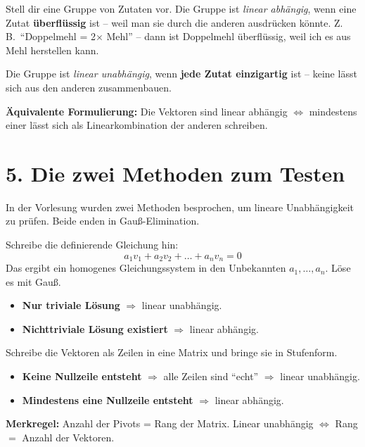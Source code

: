\documentclass[a4paper,12pt]{article}
\begin{document}
\begin{analogie}
Stell dir eine Gruppe von Zutaten vor. Die Gruppe ist \emph{linear abh\"angig}, wenn eine Zutat \textbf{\"uberfl\"ussig} ist -- weil man sie durch die anderen ausdr\"ucken k\"onnte. Z.\,B.\ ``Doppelmehl = 2$\times$ Mehl'' -- dann ist Doppelmehl \"uberfl\"ussig, weil ich es aus Mehl herstellen kann.

Die Gruppe ist \emph{linear unabh\"angig}, wenn \textbf{jede Zutat einzigartig} ist -- keine l\"asst sich aus den anderen zusammenbauen.
\end{analogie}

\textbf{\"Aquivalente Formulierung:} Die Vektoren sind linear abh\"angig $\iff$ mindestens einer l\"asst sich als Linearkombination der anderen schreiben.

\section*{5. Die zwei Methoden zum Testen}

In der Vorlesung wurden zwei Methoden besprochen, um lineare Unabh\"angigkeit zu pr\"ufen. Beide enden in Gau\ss-Elimination.

\begin{merkbox}[title={Methode 1: Homogene Gleichung}]
Schreibe die definierende Gleichung hin:
\[
a_1 v_1 + a_2 v_2 + \ldots + a_n v_n = 0
\]
Das ergibt ein homogenes Gleichungssystem in den Unbekannten $a_1, \ldots, a_n$.
L\"ose es mit Gau\ss.
\begin{itemize}
    \item \textbf{Nur triviale L\"osung} $\Rightarrow$ linear unabh\"angig.
    \item \textbf{Nichttriviale L\"osung existiert} $\Rightarrow$ linear abh\"angig.
\end{itemize}
\end{merkbox}

\begin{merkbox}[title={Methode 2: Vektoren als Zeilen, Rang per Gau\ss{}}]
Schreibe die Vektoren als Zeilen in eine Matrix und bringe sie in Stufenform.
\begin{itemize}
    \item \textbf{Keine Nullzeile entsteht} $\Rightarrow$ alle Zeilen sind ``echt'' $\Rightarrow$ linear unabh\"angig.
    \item \textbf{Mindestens eine Nullzeile entsteht} $\Rightarrow$ linear abh\"angig.
\end{itemize}
\textbf{Merkregel:} Anzahl der Pivots = Rang der Matrix. Linear unabh\"angig $\iff$ Rang $=$ Anzahl der Vektoren.
\end{merkbox}
\end{document}
